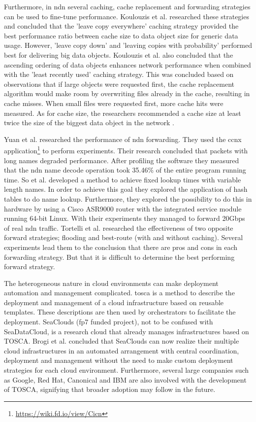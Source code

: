 Furthermore, in \gls{ndn} several caching, cache replacement and forwarding strategies can be used to fine-tune performance. Koulouzis et al. researched these strategies and concluded that the 'leave copy everywhere' caching strategy provided the best performance ratio between cache size to data object size for generic data usage. However, 'leave copy down' and 'leaving copies with probability' performed best for delivering big data objects. Koulouzis et al. also concluded that the ascending ordering of data objects enhances network performance when combined with the 'least recently used' caching strategy. This was concluded based on observations that if large objects were requested first, the cache replacement algorithm would make room by overwriting files already in the cache, resulting in cache misses. When small files were requested first, more cache hits were measured. As for cache size, the researchers recommended a cache size at least twice the size of the biggest data object in the network \cite{koulouzis2018information}.

Yuan et al. \cite{yuan2012scalable} researched the performance of \gls{ndn} forwarding. They used the \gls{ccnx} application\footnote{\url{https://wiki.fd.io/view/Cicn}} to perform experiments. Their research concluded that packets with long names degraded performance. After profiling the software they measured that the \gls{ndn} name decode operation took 35.46\% of the entire program running time. So et al. \cite{so2013named} developed a method to achieve fixed lookup times with variable length names. In order to achieve this goal they explored the application of hash tables to do name lookup. Furthermore, they explored the possibility to do this in hardware by using a Cisco ASR9000 router with the integrated service module running 64-bit Linux. With their experiments they managed to forward 20Gbps of real \gls{ndn} traffic. Tortelli et al. \cite{tortelli2013performance} researched the effectiveness of two opposite forward strategies; flooding and best-route (with and without caching). Several experiments lead them to the conclusion that there are pros and cons in each forwarding strategy. But that it is difficult to determine the best performing forward strategy.

The heterogeneous nature in cloud environments can make deployment automation and management complicated. \gls{tosca} \cite{tosca-standard} is a method to describe the deployment and management of a cloud infrastructure based on reusable templates. These descriptions are then used by orchestrators to facilitate the deployment. SeaClouds \cite{seaclouds-website} (\gls{fp7} funded project), not to be confused with SeaDataCloud, is a research cloud that already manages infrastructures based on TOSCA. Brogi et al. \cite{brogi2015adaptive} concluded that SeaClouds can now realize their multiple cloud infrastructures in an automated arrangement with central coordination, deployment and management without the need to make custom deployment strategies for each cloud environment. Furthermore, several large companies such as Google, Red Hat, Canonical and IBM are also involved with the development of TOSCA, signifying that broader adoption may follow in the future.

